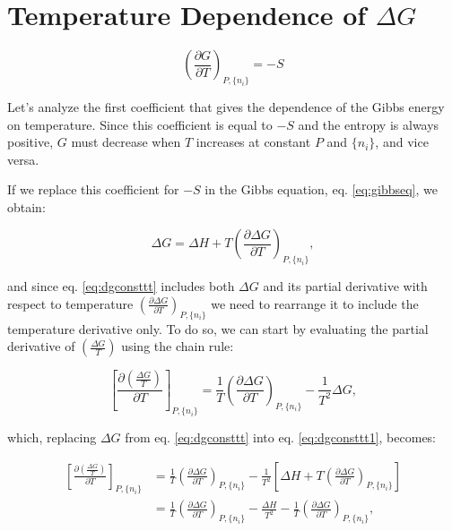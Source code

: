 \documentclass[
  9pt,
]{extbook}
\theoremstyle{definition}
\theoremstyle{definition}
\theoremstyle{definition}
\theoremstyle{definition}
\theoremstyle{remark}
\begin{document}
\section{\texorpdfstring{Temperature Dependence of \(\Delta G\)}{Temperature Dependence of \textbackslash Delta G}}\label{temperature-dependence-of-delta-g}

\[
\left(\frac{\partial G}{\partial T} \right)_{P,\{n_i\}}=-S
\]

Let's analyze the first coefficient that gives the dependence of the Gibbs energy on temperature. Since this coefficient is equal to \(-S\) and the entropy is always positive, \(G\) must decrease when \(T\) increases at constant \(P\) and \(\{n_i\}\), and vice versa.

If we replace this coefficient for \(-S\) in the Gibbs equation, eq. \eqref{eq:gibbseq}, we obtain:

\begin{equation}
\Delta G = \Delta H + T \left(\frac{\partial \Delta G}{\partial T} \right)_{P,\{n_i\}},
\label{eq:dgconsttt}
\end{equation}

and since eq. \eqref{eq:dgconsttt} includes both \(\Delta G\) and its partial derivative with respect to temperature \(\left(\frac{\partial \Delta G}{\partial T} \right)_{P,\{n_i\}}\) we need to rearrange it to include the temperature derivative only. To do so, we can start by evaluating the partial derivative of \(\left( \frac{\Delta G}{T} \right)\) using the chain rule:

\begin{equation}
\left[ \frac{\partial\left( \frac{\Delta G}{T} \right)}{\partial T} \right]_{P,\{n_i\}} = \frac{1}{T} \left(\frac{\partial \Delta G}{\partial T}  \right)_{P,\{n_i\}} - \frac{1}{T^2}\Delta G,
\label{eq:dgconsttt1}
\end{equation}

which, replacing \(\Delta G\) from eq. \eqref{eq:dgconsttt} into eq. \eqref{eq:dgconsttt1}, becomes:

\begin{equation}
\begin{aligned}
\left[ \frac{\partial\left( \frac{\Delta G}{T} \right)}{\partial T} \right]_{P,\{n_i\}} &= \frac{1}{T} \left(\frac{\partial \Delta G}{\partial T}  \right)_{P,\{n_i\}} - \frac{1}{T^2} \left[ \Delta H + T \left(\frac{\partial \Delta G}{\partial T} \right)_{P,\{n_i\}} \right] \\
&= \frac{1}{T} \left(\frac{\partial \Delta G}{\partial T}  \right)_{P,\{n_i\}}- \frac{\Delta H}{T^2}-\frac{1}{T} \left(\frac{\partial \Delta G}{\partial T}  \right)_{P,\{n_i\}},
\end{aligned}
\label{eq:dgconsttt2}
\end{equation}
\end{document}
